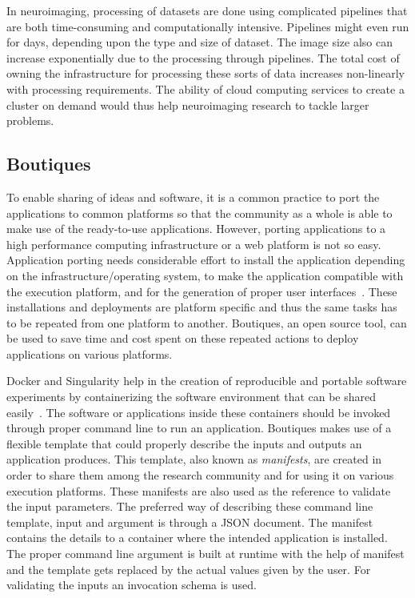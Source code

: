 In neuroimaging, processing of datasets are done using complicated pipelines that are both time-consuming and computationally intensive. Pipelines might even run for days, depending upon the type and size of dataset. The image size also can increase exponentially due to the processing through pipelines. The total cost of owning the infrastructure for processing these sorts of data increases non-linearly with processing requirements. The ability of cloud computing services to create a cluster on demand would thus help neuroimaging research to tackle larger problems.

\subsection{Boutiques}
To enable sharing of ideas and software, it is a common practice to port the applications to common platforms so that the community as a whole is able to make use of the ready-to-use applications. However, porting applications to a high performance computing infrastructure or a web platform is not so easy. Application porting needs considerable effort to install the application depending on the infrastructure/operating system, to make the application compatible with the execution platform, and for the generation of proper user interfaces~\cite{boutiques}. These installations and deployments are platform specific and thus the same tasks has to be repeated from one platform to another. Boutiques, an open source tool, can be used to save time and cost spent on these repeated actions to deploy applications on various platforms.

Docker and Singularity help in the creation of reproducible and portable software experiments by containerizing the software environment that can be shared easily~\cite{boutiques}. The software or applications inside these containers should be invoked through proper command line to run an application. Boutiques makes use of a flexible template that could properly describe the inputs and outputs an application produces. This template, also known as \textit{manifests}, are created in order to share them among the research community and for using it on various execution platforms. These manifests are also used as the reference to validate the input parameters. The preferred way of describing these command line template, input and argument is through a JSON document. The manifest contains the details to a container where the intended application is installed. The proper command line argument is built at runtime with the help of manifest and the template gets replaced by the actual values given by the user. For validating the inputs an invocation schema is used.

